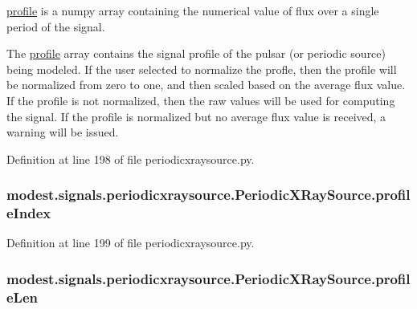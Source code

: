 \hyperlink{classmodest_1_1signals_1_1periodicxraysource_1_1PeriodicXRaySource_a584d852c7e7be3d7a3ceb886575e9039}{profile} is a numpy array containing the numerical value of flux over a single period of the signal. 

The \hyperlink{classmodest_1_1signals_1_1periodicxraysource_1_1PeriodicXRaySource_a584d852c7e7be3d7a3ceb886575e9039}{profile} array contains the signal profile of the pulsar (or periodic source) being modeled. If the user selected to normalize the profle, then the profile will be normalized from zero to one, and then scaled based on the average flux value. If the profile is not normalized, then the raw values will be used for computing the signal. If the profile is normalized but no average flux value is received, a warning will be issued. 

Definition at line 198 of file periodicxraysource.\+py.

\subsubsection[{\texorpdfstring{profile\+Index}{profileIndex}}]{\setlength{\rightskip}{0pt plus 5cm}modest.\+signals.\+periodicxraysource.\+Periodic\+X\+Ray\+Source.\+profile\+Index}\hypertarget{classmodest_1_1signals_1_1periodicxraysource_1_1PeriodicXRaySource_a008ccf30a31f3d1641df7c2504b95523}{}\label{classmodest_1_1signals_1_1periodicxraysource_1_1PeriodicXRaySource_a008ccf30a31f3d1641df7c2504b95523}


Definition at line 199 of file periodicxraysource.\+py.

\subsubsection[{\texorpdfstring{profile\+Len}{profileLen}}]{\setlength{\rightskip}{0pt plus 5cm}modest.\+signals.\+periodicxraysource.\+Periodic\+X\+Ray\+Source.\+profile\+Len}\hypertarget{classmodest_1_1signals_1_1periodicxraysource_1_1PeriodicXRaySource_ac1eeb6c4af724737f6568e2ad8f1e05c}{}\label{classmodest_1_1signals_1_1periodicxraysource_1_1PeriodicXRaySource_ac1eeb6c4af724737f6568e2ad8f1e05c}


